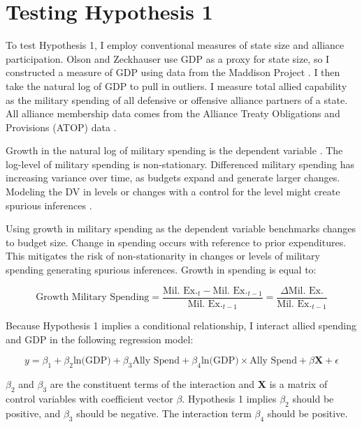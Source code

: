\documentclass[12pt]{article}
\begin{document}
\section{Testing Hypothesis 1}

To test Hypothesis 1, I employ conventional measures of state size and alliance participation. 
Olson and Zeckhauser use GDP as a proxy for state size, so I constructed a measure of GDP using data from the Maddison Project \citep{Boltetal2018}. 
I then take the natural log of GDP to pull in outliers. 
I measure total allied capability as the military spending of all defensive or offensive alliance partners of a state.
All alliance membership data comes from the Alliance Treaty Obligations and Provisions (ATOP) data \citep{Leedsetal2002}.  


Growth in the natural log of military spending is the dependent variable \citep{SingerCINC1988}. 
The log-level of military spending is non-stationary.
Differenced military spending has increasing variance over time, as budgets expand and generate larger changes. 
Modeling the DV in levels or changes with a control for the level might create spurious inferences \citep{GrangerNewbold1974}. 


Using growth in military spending as the dependent variable benchmarks changes to budget size. 
Change in spending occurs with reference to prior expenditures. 
This mitigates the risk of non-stationarity in changes or levels of military spending generating spurious inferences.
Growth in spending is equal to: 


\begin{equation}
\mbox{Growth Military Spending} = \frac{\mbox{Mil. Ex.}_t - \mbox{Mil. Ex.}_{t-1} }{ \mbox{Mil. Ex.}_{t-1} } = \frac{\Delta \mbox{Mil. Ex.} }{ \mbox{Mil. Ex.}_{t-1} }
\end{equation} 


Because Hypothesis 1 implies a conditional relationship, I interact allied spending and GDP in the following regression model:

\begin{equation} 
y = \beta_1 + \beta_2 \mbox{ln(GDP)} + \beta_3 \mbox{Ally Spend} + \beta_4 \mbox{ln(GDP)} \times \mbox{Ally Spend} + \beta \mathbf{X} + \epsilon
\end{equation}


$\beta_2$ and $\beta_3$ are the constituent terms of the interaction and \textbf{X} is a matrix of control variables with coefficient vector $\beta$.
Hypothesis 1 implies $\beta_2$ should be positive, and $\beta_3$ should be negative. 
The interaction term $\beta_4$ should be positive. 
\end{document}
